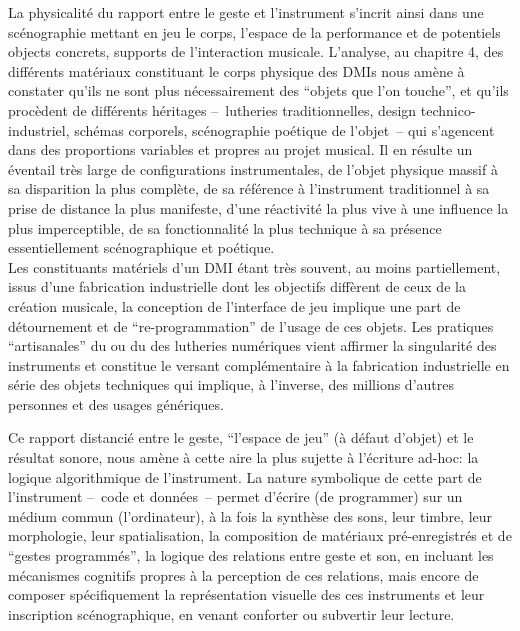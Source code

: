 \noindent La physicalité du rapport entre le geste et l'instrument s'incrit ainsi dans une scénographie mettant en jeu le corps, l'espace de la performance et de potentiels objects concrets, supports de l'interaction musicale. L'analyse, au chapitre 4, des différents matériaux constituant le corps physique des \glspl{DMI} nous amène à constater qu'ils ne sont plus nécessairement des ``objets que l'on touche'', et qu'ils procèdent de différents héritages --~lutheries traditionnelles, design technico-industriel, schémas corporels, scénographie poétique de l'objet~-- qui s'agencent dans des proportions variables et propres au projet musical. Il en résulte un éventail très large de configurations instrumentales, de l'objet physique massif à sa disparition la plus complète, de sa référence à l'instrument traditionnel à sa prise de distance la plus manifeste, d'une réactivité la plus vive à une influence la plus imperceptible, de sa fonctionnalité la plus technique à sa présence essentiellement scénographique et poétique.\\
\indent Les constituants matériels d'un \gls{DMI} étant très souvent, au moins partiellement, issus d'une fabrication industrielle dont les objectifs diffèrent de ceux de la création musicale, la conception de l'interface de jeu implique une part de détournement et de ``re-programmation'' de l'usage de ces objets. Les pratiques ``artisanales'' du  ou du  des lutheries numériques vient affirmer la singularité des instruments et constitue le versant complémentaire à la fabrication industrielle en série des objets techniques qui implique, à l'inverse, des millions d'autres personnes et des usages génériques.





Ce rapport distancié entre le geste, ``l'espace de jeu'' (à défaut d'objet) et le résultat sonore, nous amène à cette aire la plus sujette à l'écriture ad-hoc: la logique algorithmique de l'instrument. La nature symbolique de cette part de l'instrument --~code et données~--  permet d'écrire (de programmer) sur un médium commun (l'ordinateur), à la fois la synthèse des sons, leur timbre, leur morphologie, leur spatialisation, la composition de matériaux pré-enregistrés et de ``gestes programmés'', la logique des relations entre geste et son, en incluant les mécanismes cognitifs propres à la perception de ces relations, mais encore de composer spécifiquement la représentation visuelle des ces instruments et leur inscription scénographique, en venant conforter ou subvertir leur lecture.

